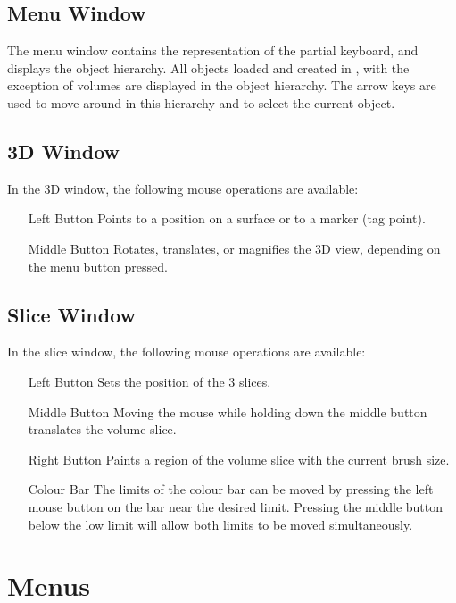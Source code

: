 \subsection{Menu Window}

The menu window contains the representation of the partial keyboard, and
displays the object hierarchy.  All objects loaded and created in \display,
with the exception of volumes are displayed in the object hierarchy.  The
arrow keys are used to move around in this hierarchy and to select the
current object.

\subsection{3D Window}

In the 3D window, the following mouse operations are available:

\begin{itemize}
\item[Left Button]  Points to a position on a surface or to a marker
                    (tag point).
\item[Middle Button]  Rotates, translates, or magnifies the 3D view, depending
                      on the menu button pressed.
\end{itemize}

\subsection{Slice Window}

In the slice window, the following mouse operations are available:

\begin{itemize}
\item[Left Button]  Sets the position of the 3 slices.
\item[Middle Button]  Moving the mouse while holding down the middle button
                      translates the volume slice.
\item[Right Button]  Paints a region of the volume slice with the current
                     brush size.
\item[Colour Bar]  The limits of the colour bar can be moved by pressing
                   the left mouse button on the bar near the desired limit.
                   Pressing the middle button below the low limit will allow
                   both limits to be moved simultaneously.
\end{itemize}

\section{Menus}

